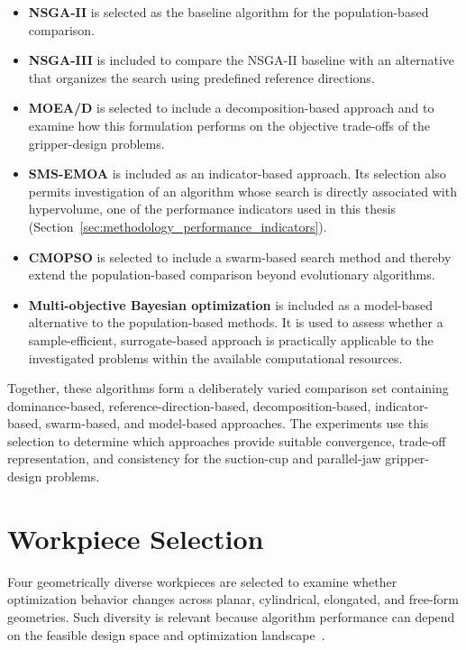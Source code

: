 \begin{itemize}
    \item \textbf{NSGA-II} is selected as the baseline algorithm for the population-based comparison.

    \item \textbf{NSGA-III} is included to compare the NSGA-II baseline with an alternative that organizes the search using predefined reference
    directions.

    \item \textbf{MOEA/D} is selected to include a decomposition-based approach and to examine how this formulation performs on the objective
    trade-offs of the gripper-design problems.

    \item \textbf{SMS-EMOA} is included as an indicator-based approach. Its selection also permits investigation of an algorithm whose search is
    directly associated with hypervolume, one of the performance indicators used in this thesis (Section~\ref{sec:methodology_performance_indicators}).

    \item \textbf{CMOPSO} is selected to include a swarm-based search method and thereby extend the population-based comparison beyond evolutionary
    algorithms.

   \item \textbf{Multi-objective Bayesian optimization} is included as a model-based
    alternative to the population-based methods. It is used to assess whether a
    sample-efficient, surrogate-based approach is practically applicable to the
    investigated problems within the available computational resources.
\end{itemize}

Together, these algorithms form a deliberately varied comparison set containing dominance-based, reference-direction-based, decomposition-based,
indicator-based, swarm-based, and model-based approaches. The experiments use this selection to determine which approaches provide suitable
convergence, trade-off representation, and consistency for the suction-cup and parallel-jaw gripper-design problems.
\section{Workpiece Selection}
\label{sec:methodology_workpiece_selection}

Four geometrically diverse workpieces are selected to examine whether
optimization behavior changes across planar, cylindrical, elongated,
and free-form geometries. Such diversity is relevant because algorithm
performance can depend on the feasible design space and optimization
landscape~\cite{Cenikj2022SELECTOR,Yazdani2020Benchmarking}.

